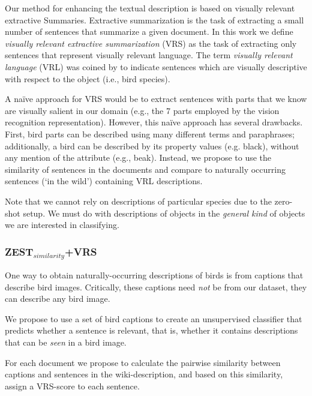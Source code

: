 \documentclass[11pt,a4paper]{article}
\begin{document}
Our method for enhancing the textual description is based on visually relevant extractive Summaries.
Extractive summarization is the task of extracting a small number of sentences that summarize a given document.
In this work we define {\em visually relevant extractive summarization} (VRS) as the task of extracting only sentences that represent {visually relevant} language. The term {\em visually relevant language} (VRL) was coined by \citet{winn2016detecting} to indicate sentences which are visually descriptive with respect to the object (i.e., bird species).


A {na\"{i}ve} approach for VRS would be to extract sentences with  parts that we know are visually salient in our domain (e.g., the 7 parts employed by the vision recognition representation).  However, this na\"{i}ve approach has several drawbacks. First, bird parts can be described using many different terms and paraphrases; additionally, a bird can be described by its property values (e.g. black), without any mention of the  attribute (e.g.,  beak). 
Instead, we propose to use the similarity of sentences in the documents and compare to naturally occurring sentences  (`in the wild') containing VRL descriptions. %

Note that we cannot rely on descriptions of particular species due to the zero-shot setup. We must do with descriptions of objects in the  {\em  general kind} %
of objects we are interested in classifying. 

\subsubsection{ZEST$_{similarity}$+VRS}
One way to obtain naturally-occurring descriptions of birds is from captions that describe bird images. Critically, these captions need {\em not}  be from  our dataset, they can describe any bird image. 

We propose to use a set of bird captions to create an unsupervised classifier that predicts whether a sentence is relevant, that is, whether it contains descriptions that can be {\em seen} in a bird image.

For each document we propose to calculate the pairwise similarity between captions and sentences in the wiki-description, and based on this similarity, assign a VRS-score to each sentence.
\end{document}
